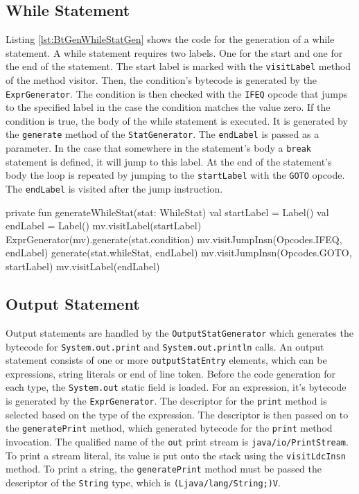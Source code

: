 \subsection{While Statement}

Listing \ref{lst:BtGenWhileStatGen} shows the code for the generation of a while statement. A while statement requires two labels. One for the start and one for the end of the statement. The start label is marked with the \verb|visitLabel| method of the method visitor. Then, the condition's bytecode is generated by the \verb|ExprGenerator|. The condition is then checked with the \verb|IFEQ| opcode that jumps to the specified label in the case the condition matches the value zero. If the condition is true, the body of the while statement is executed. It is generated by the \verb|generate| method of the \verb|StatGenerator|. The \verb|endLabel| is passed as a parameter. In the case that somewhere in the statement's body a \verb|break| statement is defined, it will jump to this label. At the end of the statement's body the loop is repeated by jumping to the \verb|startLabel| with the \verb|GOTO| opcode. The \verb|endLabel| is visited after the jump instruction. 


\begin{KotlinCode}[float,numbers=none,caption=Implementation of the \texttt{generateInputStat} method of the \texttt{StatGenerator}., label=lst:BtGenWhileStatGen]
private fun generateWhileStat(stat: WhileStat) {
    val startLabel = Label()
    val endLabel = Label()
    mv.visitLabel(startLabel)
    ExprGenerator(mv).generate(stat.condition)
    mv.visitJumpInsn(Opcodes.IFEQ, endLabel)
    generate(stat.whileStat, endLabel)
    mv.visitJumpInsn(Opcodes.GOTO, startLabel)
    mv.visitLabel(endLabel)
}
    \end{KotlinCode}

\subsection{Output Statement}

Output statements are handled by the \verb|OutputStatGenerator| which generates the bytecode for \verb|System.out.print| and \verb|System.out.println| calls. An output statement consists of one or more \verb|outputStatEntry| elements, which can be expressions, string literals or end of line token. Before the code generation for each type, the \verb|System.out| static field is loaded. For an expression, it's bytecode is generated by the \verb|ExprGenerator|. The descriptor for the \verb|print| method is selected based on the type of the expression. The descriptor is then passed on to the \verb|generatePrint| method, which generated bytecode for the \verb|print| method invocation. The qualified name of the \verb|out| print stream is \texttt{java/io/PrintStream}. To print a stream literal, its value is put onto the stack using the \verb|visitLdcInsn| method. To print a string, the \verb|generatePrint| method must be passed the descriptor of the \verb|String| type, which is \texttt{(Ljava/lang/String;)V}. 


